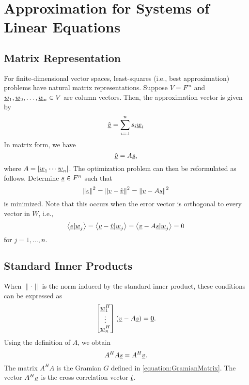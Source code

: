 \section{Approximation for Systems of Linear Equations}

\subsection{Matrix Representation}

For finite-dimensional vector spaces, least-squares (i.e., best approximation) problems have natural matrix representations.
Suppose $V = F^m$ and $\underline{w}_1, \underline{w}_2, \ldots, \underline{w}_n \in V$ are column vectors.
Then, the approximation vector is given by
\begin{equation*}
\hat{\underline{v}} = \sum_{i=1}^n s_i \underline{w}_i
\end{equation*}
In matrix form, we have
\begin{equation*}
\hat{\underline{v}} = A \underline{s},
\end{equation*}
where $A = \left[ \underline{w}_1 \cdots \underline{w}_n \right]$.
The optimization problem can then be reformulated as follows.
Determine $\underline{s} \in F^n$ such that
\begin{equation*}
\left\| \underline{e} \right\|^2
= \left\| \underline{v} - \hat{\underline{v}} \right\|^2
= \left\| \underline{v} - A \underline{s} \right\|^2
\end{equation*}
is minimized.
Note that this occurs when the error vector is orthogonal to every vector in $W$, i.e.,
\begin{equation*}
\left\langle \underline{e} | \underline{w}_j \right\rangle
= \left\langle \underline{v} - \hat{\underline{v}} | \underline{w}_j \right\rangle
= \left\langle \underline{v} - A \underline{s} | \underline{w}_j \right\rangle
= 0
\end{equation*}
for $j = 1, \ldots, n$.


\subsection{Standard Inner Products}

When $\| \cdot \|$ is the norm induced by the standard inner product, these conditions can be expressed as
\begin{equation*}
\begin{bmatrix} \underline{w}_1^H \\ \vdots \\ \underline{w}_n^H \end{bmatrix} \left( \underline{v} - A \underline{s} \right) = \underline{0} .
\end{equation*}
Using the definition of $A$, we obtain
\begin{equation*}
A^H A \underline{s} = A^H \underline{v} .
\end{equation*}
The matrix $A^H A$ is the Gramian $G$ defined in \eqref{equation:GramianMatrix}.
The vector $A^H \underline{v}$ is the cross correlation vector $\underline{t}$.

